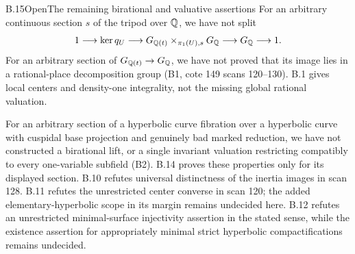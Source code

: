\begin{statement}{B.15}{Open}{The remaining birational and valuative assertions}
For an arbitrary continuous section $s$ of the tripod over $\mathbb Q$,
we have not split
\[
 1\longrightarrow\ker q_U\longrightarrow
 G_{\mathbb Q(t)}\times_{\pi_1(U),s}G_\mathbb Q
 \longrightarrow G_\mathbb Q\longrightarrow1.
\]
For an arbitrary section of $G_{\mathbb Q(t)}\to G_\mathbb Q$, we have not
proved that its image lies in a rational-place decomposition group
(B1, cote 149 scans 120--130).  B.1 gives local centers and density-one
integrality, not the missing global rational valuation.

For an arbitrary section of a hyperbolic curve fibration over a
hyperbolic curve with cuspidal base projection and genuinely bad
marked reduction, we have not constructed a birational lift, or
a single invariant valuation restricting compatibly to every
one-variable subfield (B2).  B.14 proves these properties only
for its displayed section.  B.10 refutes universal distinctness
of the inertia images in scan 128.  B.11 refutes the unrestricted
center converse in scan 120; the added elementary-hyperbolic
scope in its margin remains undecided here.  B.12 refutes an
unrestricted minimal-surface injectivity assertion in the stated
sense, while the existence assertion for appropriately minimal
strict hyperbolic compactifications remains undecided.
\end{statement}
